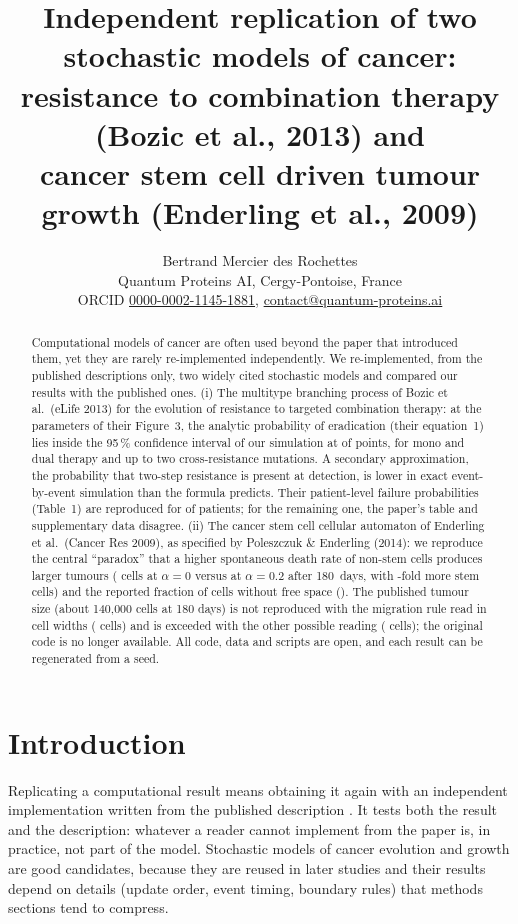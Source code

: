\documentclass[11pt]{article}
\title{Independent replication of two stochastic models of cancer:\\
resistance to combination therapy (Bozic et al., 2013) and\\
cancer stem cell driven tumour growth (Enderling et al., 2009)}
\author{Bertrand Mercier des Rochettes\\[2pt]
\small Quantum Proteins AI, Cergy-Pontoise, France\\
\small ORCID \href{https://orcid.org/0000-0002-1145-1881}{0000-0002-1145-1881},
\href{mailto:contact@quantum-proteins.ai}{contact@quantum-proteins.ai}}
\date{}
\begin{document}
\maketitle

\begin{abstract}
Computational models of cancer are often used beyond the paper that introduced them, yet
they are rarely re-implemented independently. We re-implemented, from the published
descriptions only, two widely cited stochastic models and compared our results with the
published ones. (i) The multitype branching process of Bozic et al.\ (eLife 2013) for the
evolution of resistance to targeted combination therapy: at the parameters of their
Figure~3, the analytic probability of eradication (their equation~1) lies inside the 95\,\%
confidence interval of our simulation at \BozicInside{} of \BozicPoints{} points, for mono
and dual therapy and up to two cross-resistance mutations. A secondary approximation, the
probability that two-step resistance is present at detection, is \BozicTwoStepExactDev{}
lower in exact event-by-event simulation than the formula predicts. Their patient-level failure probabilities (Table~1) are reproduced for
\BozicPatientsMatch{} of \BozicPatients{} patients; for the remaining one, the paper's table and
supplementary data disagree. (ii) The cancer stem cell cellular
automaton of Enderling et al.\ (Cancer Res 2009), as specified by Poleszczuk \& Enderling
(2014): we reproduce the central ``paradox'' that a higher spontaneous death rate of
non-stem cells produces larger tumours (\CAParadoxLow{} cells at $\alpha=0$ versus
\CAParadoxHigh{} at $\alpha=0.2$ after 180~days, with \CAStemRatio{}-fold more stem
cells) and the reported fraction of cells without free space (\CAQuiescent{}). The
published tumour size (about 140{,}000 cells at 180 days) is not reproduced with the
migration rule read in cell widths (\CASizeCellWidths{} cells) and is exceeded with the
other possible reading (\CASizeLiteral{} cells); the original code is no longer available.
All code, data and scripts are open, and each result can be regenerated from a seed.
\end{abstract}

\section{Introduction}
Replicating a computational result means obtaining it again with an independent
implementation written from the published description \cite{rescience}. It tests both the
result and the description: whatever a reader cannot implement from the paper is, in
practice, not part of the model. Stochastic models of cancer evolution and growth are good
candidates, because they are reused in later studies and their results depend on details
(update order, event timing, boundary rules) that methods sections tend to compress.
\end{document}
